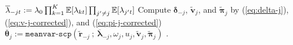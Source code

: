 \begin{algorithm}
{{      $\overline{\lambda}_{-jt} := \lambda_0\prod_{k=1}^K \mathbb{E}[\lambda_{kt}]\prod_{j' \neq j}\mathbb{E}[\lambda_{j't}] $ 
      Compute $\boldsymbol{\delta}_{-j}$, $\tilde{\mathbf{v}}_{j}$, and $\tilde{\boldsymbol{\boldsymbol{\pi}}}_{j}$ by (\ref{eq:delta-j}), (\ref{eq:v-j-corrected}), and (\ref{eq:pi-j-corrected})  
      $\overline{\boldsymbol{\theta}}_j := \texttt{meanvar-scp}(\tilde{\mathbf{r}}_{-j} \:;\:\overline{\boldsymbol{\lambda}}_{-j}, \omega_j, u_j, \tilde{\mathbf{v}}_{j}, \tilde{\boldsymbol{\boldsymbol{\pi}}}_j)$ 
    }
  }
  .
\end{algorithm}